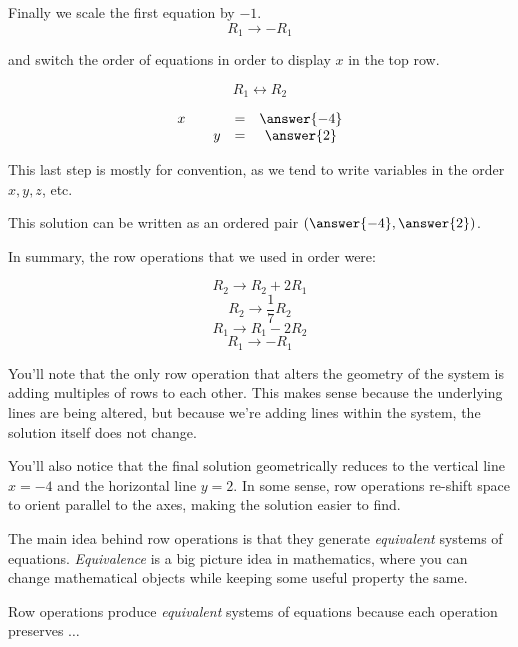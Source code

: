 \documentclass{ximera}
\begin{document}
\begin{exploration}
\begin{example}
    Finally we scale the first equation by $-1$. $$R_1\rightarrow -R_1$$
         
    and switch the order of equations in order to display $x$ in the top row. 
    
    $$R_1\leftrightarrow R_2$$ 
     
    $$\begin{matrix}
          x & &&= &\answer{-4}\\
          & &y&=&\answer{2}     
        \end{matrix}$$
    
    This last step is mostly for convention, as we tend to write variables in the order $x, y, z$, etc.
       
    This solution can be written as an ordered pair $(\answer{-4}, \answer{2})$.
    
        \begin{solution}
    
            In summary, the row operations that we used in  order were:
    
            $$R_2\rightarrow R_2+2R_1$$
            $$R_2\rightarrow \frac{1}{7}R_2$$
            $$R_1\rightarrow R_1-2R_2$$
            $$R_1\rightarrow -R_1$$

        You'll note that the only row operation that alters the geometry of the system is adding multiples of rows to each other. This makes sense because the underlying lines are being altered, but because we're adding lines within the system, the solution itself does not change.

        You'll also notice that the final solution geometrically reduces to the vertical line $x=-4$ and the horizontal line $y=2$. In some sense, row operations re-shift space to orient parallel to the axes, making the solution easier to find.
    
        \end{solution}

      \end{example}
    
    The main idea behind row operations is that they generate \emph{equivalent} systems of equations. \emph{Equivalence} is a big picture idea in mathematics, where you can change mathematical objects while keeping some useful property the same.
    
    \begin{example}
    
        Row operations produce \emph{equivalent} systems of equations because each operation preserves $\ldots$
    

\end{example}
\end{exploration}
\end{document}
